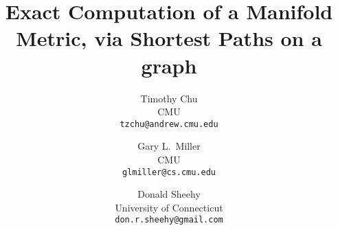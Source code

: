 \documentclass[11pt]{article}
\title{Exact Computation of a Manifold Metric, via Shortest Paths on a
graph}
\author{
  Timothy Chu \\
  CMU\\
  \texttt{tzchu@andrew.cmu.edu}
  \and
  Gary L.\ Miller\\
  CMU\\
  \texttt{glmiller@cs.cmu.edu} \\
  \and
    \newline
  Donald Sheehy\\
  University of Connecticut \\
  \texttt{don.r.sheehy@gmail.com}
}
\begin{document}
  \setcounter{page}{0}
  \maketitle
  \thispagestyle{empty}
  
  \clearpage
  
  
  
	
  
  





\begin{appendices}

\end{appendices}


 
  \clearpage
   
      
\end{document}
